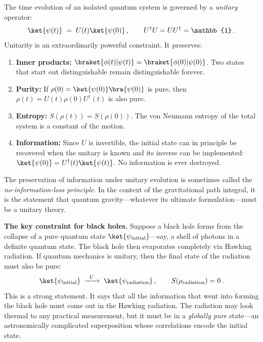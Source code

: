 \documentclass[11pt,letterpaper]{article}
\theoremstyle{plain}
\theoremstyle{definition}
\theoremstyle{remark}
\begin{document}
The time evolution of an isolated quantum system is governed by a \emph{unitary}
operator:
\begin{equation}\label{eq02:unitary_evolution}
  \ket{\psi(t)} \;=\; U(t)\ket{\psi(0)}\,,
  \qquad U^\dagger U = U U^\dagger = \mathbb{1}\,.
\end{equation}
Unitarity is an extraordinarily powerful constraint.  It preserves:
\begin{enumerate}[label=(\roman*),itemsep=2pt]
\item \textbf{Inner products:} $\braket{\phi(t)|\psi(t)} = \braket{\phi(0)|\psi(0)}$.
Two states that start out distinguishable remain distinguishable forever.

\item \textbf{Purity:} If $\rho(0) = \ket{\psi(0)}\bra{\psi(0)}$ is pure, then
$\rho(t) = U(t)\rho(0)U^\dagger(t)$ is also pure.

\item \textbf{Entropy:} $S(\rho(t)) = S(\rho(0))$.  The von Neumann entropy of
the total system is a constant of the motion.

\item \textbf{Information:} Since $U$ is invertible, the initial state can in principle be
recovered when the unitary is known and its inverse can be implemented: $\ket{\psi(0)} = U^\dagger(t)\ket{\psi(t)}$.
No information is ever destroyed.
\end{enumerate}

The preservation of information under unitary evolution is sometimes called the
\emph{no-information-loss principle}.  In the context of the gravitational path
integral, it is the statement that quantum gravity---whatever its ultimate
formulation---must be a unitary theory.

\medskip
\noindent\textbf{The key constraint for black holes.}
Suppose a black hole forms from the collapse of a pure quantum state
$\ket{\psi_{\mathrm{initial}}}$---say, a shell of photons in a definite quantum
state.  The black hole then evaporates completely via Hawking radiation.  If
quantum mechanics is unitary, then the final state of the radiation must also be
pure:
\begin{equation}\label{eq02:unitarity_constraint}
  \ket{\psi_{\mathrm{initial}}} \;\xrightarrow{\;\;U\;\;}
  \;\ket{\psi_{\mathrm{radiation}}}\,,
  \qquad
  S(\rho_{\mathrm{radiation}}) = 0\,.
\end{equation}
This is a strong statement.  It says that all the information that went
into forming the black hole must come out in the Hawking radiation.  The radiation
may look thermal to any practical measurement, but it must be in a \emph{globally
pure} state---an astronomically complicated superposition whose correlations encode
the initial state.
\end{document}
